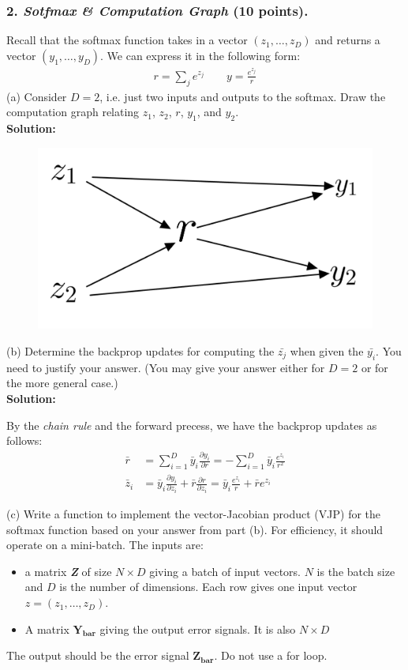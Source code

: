 \documentclass[12pt]{article}%
\newcommand{\PARTIAL}[2]{\frac{\partial #1}{\partial #2}}
\begin{document}
\pagebreak

\subsubsection*{2. \textit{Sotfmax \& Computation Graph} (10 points).}
Recall that the softmax function takes in a vector $(z_1, \dots , z_D)$ and returns a
vector $(y_1, \dots , y_D)$. We can express it in the following form:
\begin{equation*}
    \begin{split}
    r = \sum_j e^{z_j}   \qquad y = \frac{e^{z_j}}{r}
\end{split}
\end{equation*}
(a) Consider $D = 2$, i.e. just two inputs and outputs to the softmax. Draw the
computation graph relating $z_1$, $z_2$, $r$, $y_1$, and $y_2$.
\vspace{1em}\\
{\bf Solution:}
\begin{figure}[h]
    \begin{center}
        \includegraphics[width=0.5\columnwidth]{img/Q2(a).jpeg}        
    \end{center}
\end{figure}


(b) Determine the backprop updates for computing the $\bar{z_j}$ when given the $\bar{y_i}$.
You need to justify your answer. (You may give your answer either for
$D = 2$ or for the more general case.)\\
{\bf Solution:}
\par By the {\it chain rule} and the forward precess, we have the backprop updates as follows:
\begin{align*}
    \bar{r} &= \sum_{i=1}^D \bar{y}_i \PARTIAL{y_i}{r} = -\sum_{i=1}^D\bar{y}_i\frac{e^{z_i}}{r^2}\\
    \bar{z}_i &= \bar{y}_i\PARTIAL{y_i}{z_i} + \bar{r}\PARTIAL{r}{z_i} = \bar{y}_i\frac{e^{z_i}}{r} + \bar{r}e^{z_i}
\end{align*}

(c) Write a function to implement the vector-Jacobian product (VJP) for the
softmax function based on your answer from part (b). For efficiency, it should
operate on a mini-batch.
The inputs are:
\begin{itemize}
    \item a matrix \textit{\textbf{Z}} of size $N \times D$ giving a batch of input vectors. $N$ is the batch
size and $D$ is the number of dimensions. Each row gives one input vector
$z = (z_1, \dots , z_D)$.
    \item A matrix $\mathbf{Y_{bar}}$ giving the output error signals. It is also $N \times D$
\end{itemize} 
\indent The output should be the error signal $\mathbf{Z_{bar}}$. Do not use a for loop.
\end{document}
